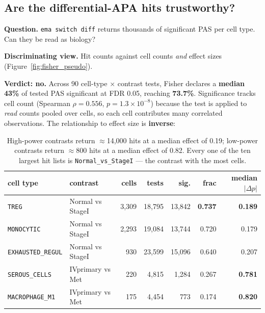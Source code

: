 \documentclass[11pt,a4paper]{article}
\begin{document}
\subsection{Are the differential-APA hits trustworthy?}
\label{sec:q_fisher}

\textbf{Question.} \texttt{ema switch diff} returns thousands of significant PAS
per cell type. Can they be read as biology?

\textbf{Discriminating view.} Hit counts against cell counts \emph{and} effect
sizes (Figure~\ref{fig:fisher_pseudo}).

\textbf{Verdict: no.} Across 90 cell-type $\times$ contrast tests, Fisher declares
a \textbf{median 43\%} of tested PAS significant at FDR 0.05, reaching
\textbf{73.7\%}. Significance tracks cell count
(Spearman $\rho = 0.556$, $p = 1.3\times10^{-8}$) because the test is applied to
\emph{read} counts pooled over cells, so each cell contributes many correlated
observations. The relationship to effect size is \textbf{inverse}:

\begin{table}[htbp]
  \centering
  \small
  \begin{tabular}{llrrrrr}
    \toprule
    cell type & contrast & cells & tests & sig. & frac & median $|\Delta p|$ \\
    \midrule
    \texttt{TREG}            & Normal vs StageI & 3,309 & 18,795 & 13,842 & \textbf{0.737} & \textbf{0.189} \\
    \texttt{MONOCYTIC}       & Normal vs StageI & 2,293 & 19,084 & 13,744 & 0.720 & 0.179 \\
    \texttt{EXHAUSTED\_REGUL}& Normal vs StageI &   930 & 23,599 & 15,096 & 0.640 & 0.207 \\
    \midrule
    \texttt{SEROUS\_CELLS}   & IVprimary vs Met &   220 &  4,815 &  1,284 & 0.267 & \textbf{0.781} \\
    \texttt{MACROPHAGE\_M1}  & IVprimary vs Met &   175 &  4,454 &    773 & 0.174 & \textbf{0.820} \\
    \bottomrule
  \end{tabular}
  \caption{High-power contrasts return $\approx$14,000 hits at a median effect of
    0.19; low-power contrasts return $\approx$800 hits at a median effect of 0.82.
    Every one of the ten largest hit lists is \texttt{Normal\_vs\_StageI} --- the
    contrast with the most cells.}
  \label{tab:fisher_power_crossexp}
\end{table}
\end{document}
